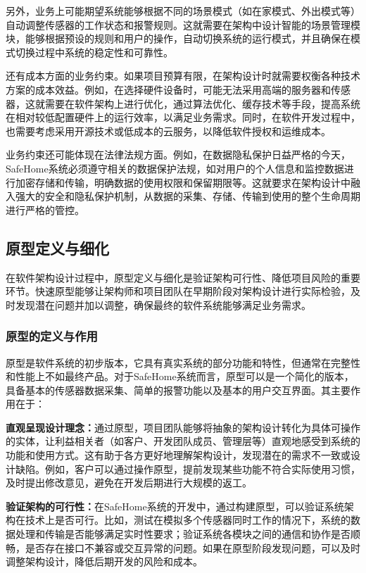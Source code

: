 另外，业务上可能期望系统能够根据不同的场景模式（如在家模式、外出模式等）自动调整传感器的工作状态和报警规则。这就需要在架构中设计智能的场景管理模块，能够根据预设的规则和用户的操作，自动切换系统的运行模式，并且确保在模式切换过程中系统的稳定性和可靠性。

还有成本方面的业务约束。如果项目预算有限，在架构设计时就需要权衡各种技术方案的成本效益。例如，在选择硬件设备时，可能无法采用高端的服务器和传感器，这就需要在软件架构上进行优化，通过算法优化、缓存技术等手段，提高系统在相对较低配置硬件上的运行效率，以满足业务需求。同时，在软件开发过程中，也需要考虑采用开源技术或低成本的云服务，以降低软件授权和运维成本。

业务约束还可能体现在法律法规方面。例如，在数据隐私保护日益严格的今天，SafeHome系统必须遵守相关的数据保护法规，如对用户的个人信息和监控数据进行加密存储和传输，明确数据的使用权限和保留期限等。这就要求在架构设计中融入强大的安全和隐私保护机制，从数据的采集、存储、传输到使用的整个生命周期进行严格的管控。

\subsection{原型定义与细化}

在软件架构设计过程中，原型定义与细化是验证架构可行性、降低项目风险的重要环节。快速原型能够让架构师和项目团队在早期阶段对架构设计进行实际检验，及时发现潜在问题并加以调整，确保最终的软件系统能够满足业务需求。

\subsubsection{原型的定义与作用}

原型是软件系统的初步版本，它具有真实系统的部分功能和特性，但通常在完整性和性能上不如最终产品。对于SafeHome系统而言，原型可以是一个简化的版本，具备基本的传感器数据采集、简单的报警功能以及基本的用户交互界面。其主要作用在于：

\textbf{直观呈现设计理念：}通过原型，项目团队能够将抽象的架构设计转化为具体可操作的实体，让利益相关者（如客户、开发团队成员、管理层等）直观地感受到系统的功能和使用方式。这有助于各方更好地理解架构设计，发现潜在的需求不一致或设计缺陷。例如，客户可以通过操作原型，提前发现某些功能不符合实际使用习惯，及时提出修改意见，避免在开发后期进行大规模的返工。

\textbf{验证架构的可行性：}在SafeHome系统的开发中，通过构建原型，可以验证系统架构在技术上是否可行。比如，测试在模拟多个传感器同时工作的情况下，系统的数据处理和传输是否能够满足实时性要求；验证系统各模块之间的通信和协作是否顺畅，是否存在接口不兼容或交互异常的问题。如果在原型阶段发现问题，可以及时调整架构设计，降低后期开发的风险和成本。

